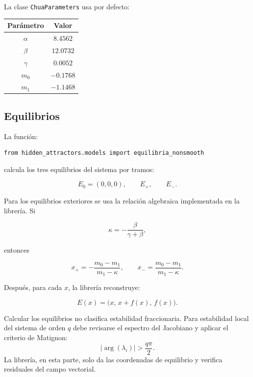\documentclass[11pt,letterpaper]{article}
\begin{document}
La clase \texttt{ChuaParameters} usa por defecto:

\begin{center}
\begin{tabular}{cc}
\toprule
Parámetro & Valor \\
\midrule
$\alpha$ & $8.4562$ \\
$\beta$ & $12.0732$ \\
$\gamma$ & $0.0052$ \\
$m_0$ & $-0.1768$ \\
$m_1$ & $-1.1468$ \\
\bottomrule
\end{tabular}
\end{center}

\subsection{Equilibrios}

La función:

\begin{lstlisting}[style=python]
from hidden_attractors.models import equilibria_nonsmooth
\end{lstlisting}

calcula los tres equilibrios del sistema por tramos:

\begin{equation}
E_0=(0,0,0), \qquad E_+, \qquad E_-.
\end{equation}

Para los equilibrios exteriores se usa la relación algebraica implementada en la librería. Si

\begin{equation}
\kappa=-\frac{\beta}{\gamma+\beta},
\end{equation}

entonces

\begin{equation}
 x_+ = -\frac{m_0-m_1}{m_1-\kappa},
 \qquad
 x_- = \frac{m_0-m_1}{m_1-\kappa}.
\end{equation}

Después, para cada $x$, la librería reconstruye:

\begin{equation}
E(x)=\bigl(x,\,x+f(x),\,f(x)\bigr).
\end{equation}

\begin{advertencia}
Calcular los equilibrios no clasifica estabilidad fraccionaria. Para estabilidad local del sistema de orden $q$ debe revisarse el espectro del Jacobiano y aplicar el criterio de Matignon:
\begin{equation}
|\arg(\lambda_i)|>\frac{q\pi}{2}.
\end{equation}
La librería, en esta parte, solo da las coordenadas de equilibrio y verifica residuales del campo vectorial.
\end{advertencia}
\end{document}
